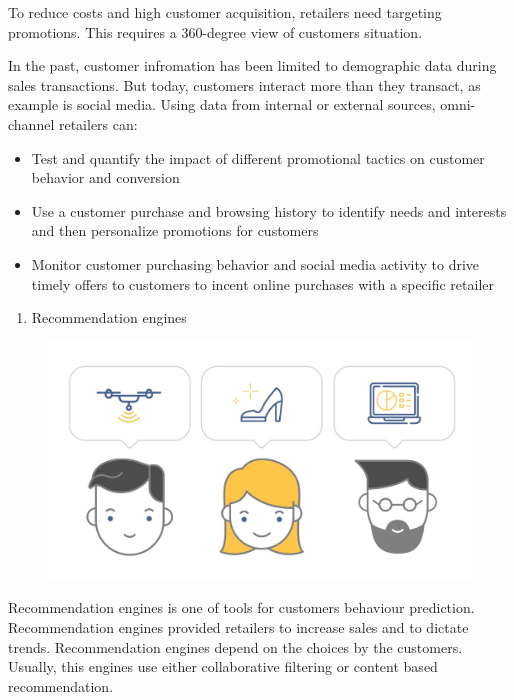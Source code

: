 \documentclass[]{book}
\providecommand{\tightlist}{%
  \setlength{\itemsep}{0pt}\setlength{\parskip}{0pt}}
\begin{document}
To reduce costs and high customer acquisition, retailers need targeting
promotions. This requires a 360-degree view of customers situation.

In the past, customer infromation has been limited to demographic data
during sales transactions. But today, customers interact more than they
transact, as example is social media. Using data from internal or
external sources, omni-channel retailers can:

\begin{itemize}
\tightlist
\item
  Test and quantify the impact of different promotional tactics on
  customer behavior and conversion
\item
  Use a customer purchase and browsing history to identify needs and
  interests and then personalize promotions for customers
\item
  Monitor customer purchasing behavior and social media activity to
  drive timely offers to customers to incent online purchases with a
  specific retailer
\end{itemize}

\begin{enumerate}
\def\labelenumi{\arabic{enumi}.}
\setcounter{enumi}{4}
\tightlist
\item
  Recommendation engines
\end{enumerate}

\begin{figure}
\centering
\includegraphics{17.jpg}
\caption{}
\end{figure}

Recommendation engines is one of tools for customers behaviour
prediction. Recommendation engines provided retailers to increase sales
and to dictate trends. Recommendation engines depend on the choices by
the customers. Usually, this engines use either collaborative filtering
or content based recommendation.
\end{document}
